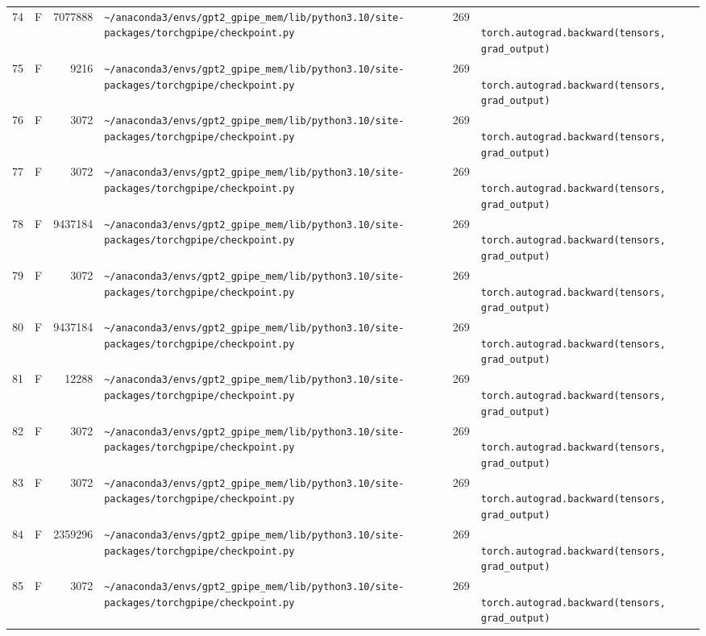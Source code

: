 \documentclass{article}
\begin{document}
\begin{longtable}{r l r p{6.5cm} r p{7.0cm}}
74 & F & 7077888 & \lstinline|~/anaconda3/envs/gpt2_gpipe_mem/lib/python3.10/site-packages/torchgpipe/checkpoint.py| & 269 & \lstinline|            torch.autograd.backward(tensors, grad_output)| \\
75 & F & 9216 & \lstinline|~/anaconda3/envs/gpt2_gpipe_mem/lib/python3.10/site-packages/torchgpipe/checkpoint.py| & 269 & \lstinline|            torch.autograd.backward(tensors, grad_output)| \\
76 & F & 3072 & \lstinline|~/anaconda3/envs/gpt2_gpipe_mem/lib/python3.10/site-packages/torchgpipe/checkpoint.py| & 269 & \lstinline|            torch.autograd.backward(tensors, grad_output)| \\
77 & F & 3072 & \lstinline|~/anaconda3/envs/gpt2_gpipe_mem/lib/python3.10/site-packages/torchgpipe/checkpoint.py| & 269 & \lstinline|            torch.autograd.backward(tensors, grad_output)| \\
78 & F & 9437184 & \lstinline|~/anaconda3/envs/gpt2_gpipe_mem/lib/python3.10/site-packages/torchgpipe/checkpoint.py| & 269 & \lstinline|            torch.autograd.backward(tensors, grad_output)| \\
79 & F & 3072 & \lstinline|~/anaconda3/envs/gpt2_gpipe_mem/lib/python3.10/site-packages/torchgpipe/checkpoint.py| & 269 & \lstinline|            torch.autograd.backward(tensors, grad_output)| \\
80 & F & 9437184 & \lstinline|~/anaconda3/envs/gpt2_gpipe_mem/lib/python3.10/site-packages/torchgpipe/checkpoint.py| & 269 & \lstinline|            torch.autograd.backward(tensors, grad_output)| \\
81 & F & 12288 & \lstinline|~/anaconda3/envs/gpt2_gpipe_mem/lib/python3.10/site-packages/torchgpipe/checkpoint.py| & 269 & \lstinline|            torch.autograd.backward(tensors, grad_output)| \\
82 & F & 3072 & \lstinline|~/anaconda3/envs/gpt2_gpipe_mem/lib/python3.10/site-packages/torchgpipe/checkpoint.py| & 269 & \lstinline|            torch.autograd.backward(tensors, grad_output)| \\
83 & F & 3072 & \lstinline|~/anaconda3/envs/gpt2_gpipe_mem/lib/python3.10/site-packages/torchgpipe/checkpoint.py| & 269 & \lstinline|            torch.autograd.backward(tensors, grad_output)| \\
84 & F & 2359296 & \lstinline|~/anaconda3/envs/gpt2_gpipe_mem/lib/python3.10/site-packages/torchgpipe/checkpoint.py| & 269 & \lstinline|            torch.autograd.backward(tensors, grad_output)| \\
85 & F & 3072 & \lstinline|~/anaconda3/envs/gpt2_gpipe_mem/lib/python3.10/site-packages/torchgpipe/checkpoint.py| & 269 & \lstinline|            torch.autograd.backward(tensors, grad_output)| \\

\end{longtable}
\end{document}
